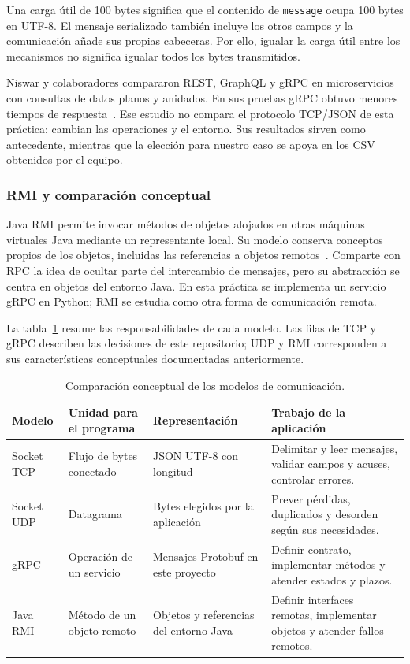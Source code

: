 Una carga útil de 100 bytes significa que el contenido de \texttt{message} ocupa
100 bytes en UTF-8. El mensaje serializado también incluye los otros campos y la
comunicación añade sus propias cabeceras. Por ello, igualar la carga útil entre
los mecanismos no significa igualar todos los bytes transmitidos.

Niswar y colaboradores compararon REST, GraphQL y gRPC en microservicios con
consultas de datos planos y anidados. En sus pruebas gRPC obtuvo menores tiempos
de respuesta~\cite{nixon_niswar2024_microservices}. Ese estudio no compara el
protocolo TCP/JSON de esta práctica: cambian las operaciones y el entorno. Sus
resultados sirven como antecedente, mientras que la elección para nuestro caso
se apoya en los CSV obtenidos por el equipo.

\subsubsection{RMI y comparación conceptual}
Java RMI permite invocar métodos de objetos alojados en otras máquinas virtuales
Java mediante un representante local. Su modelo conserva conceptos propios de
los objetos, incluidas las referencias a objetos remotos~\cite{nixon_oracle_rmi}.
Comparte con RPC la idea de ocultar parte del intercambio de mensajes, pero su
abstracción se centra en objetos del entorno Java. En esta práctica se implementa
un servicio gRPC en Python; RMI se estudia como otra forma de comunicación remota.

La tabla~\ref{tab:nixon-modelos} resume las responsabilidades de cada modelo.
Las filas de TCP y gRPC describen las decisiones de este repositorio; UDP y RMI
corresponden a sus características conceptuales documentadas anteriormente.

\begin{table}[htbp]
\centering
\small
\begin{tabular}{@{}p{2.1cm}p{3.5cm}p{4cm}p{4.7cm}@{}}
\toprule
Modelo & Unidad para el programa & Representación & Trabajo de la aplicación \\
\midrule
Socket TCP & Flujo de bytes conectado & JSON UTF-8 con longitud & Delimitar y leer mensajes, validar campos y acuses, controlar errores. \\
\addlinespace
Socket UDP & Datagrama & Bytes elegidos por la aplicación & Prever pérdidas, duplicados y desorden según sus necesidades. \\
\addlinespace
gRPC & Operación de un servicio & Mensajes Protobuf en este proyecto & Definir contrato, implementar métodos y atender estados y plazos. \\
\addlinespace
Java RMI & Método de un objeto remoto & Objetos y referencias del entorno Java & Definir interfaces remotas, implementar objetos y atender fallos remotos. \\
\bottomrule
\end{tabular}
\caption{Comparación conceptual de los modelos de comunicación.}
\label{tab:nixon-modelos}
\end{table}


